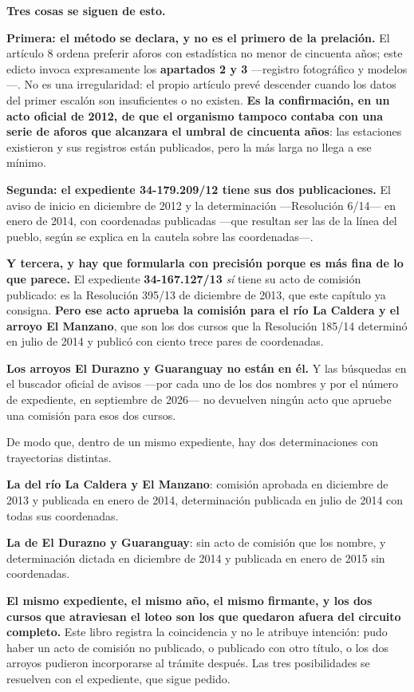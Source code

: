 \begin{cautela}
\textbf{Tres cosas se siguen de esto.}

\textbf{Primera: el método se declara, y no es el primero de la prelación.} El artículo 8
ordena preferir aforos con estadística no menor de cincuenta años; este edicto invoca
expresamente los \textbf{apartados 2 y 3} ---registro fotográfico y modelos---. No es una
irregularidad: el propio artículo prevé descender cuando los datos del primer escalón son
insuficientes o no existen. \textbf{Es la confirmación, en un acto oficial de 2012, de que el organismo tampoco contaba con una serie de aforos que alcanzara el umbral de cincuenta años}: las estaciones existieron y sus registros están publicados, pero la más larga no llega a ese mínimo.

\textbf{Segunda: el expediente 34-179.209/12 tiene sus dos publicaciones.} El aviso de inicio
en diciembre de 2012 y la determinación ---Resolución 6/14--- en enero de 2014, con coordenadas publicadas
---que resultan ser las de la línea del pueblo, según se explica en la cautela sobre las coordenadas---.

\textbf{Y tercera, y hay que formularla con precisión porque es más fina de lo que parece.}
El expediente \textbf{34-167.127/13} \textit{sí} tiene su acto de comisión publicado: es la
Resolución 395/13 de diciembre de 2013, que este capítulo ya consigna. \textbf{Pero ese acto
aprueba la comisión para el río La Caldera y el arroyo El Manzano}, que son los dos cursos que
la Resolución 185/14 determinó en julio de 2014 y publicó con ciento trece pares de
coordenadas.

\textbf{Los arroyos El Durazno y Guaranguay no están en él.} Y las búsquedas en el buscador
oficial de avisos ---por cada uno de los dos nombres y por el número de expediente, en septiembre de 2026--- no
devuelven ningún acto que apruebe una comisión para esos dos cursos.

\end{cautela}

\begin{cautela}
De modo que, dentro de un mismo expediente, hay dos determinaciones con trayectorias distintas.

\textbf{La del río La Caldera y El Manzano}: comisión aprobada en diciembre de 2013 y publicada en enero de
2014, determinación publicada en julio de 2014 con todas sus coordenadas.

\textbf{La de El Durazno y Guaranguay}: sin acto de comisión que los nombre, y determinación
dictada en diciembre de 2014 y publicada en enero de 2015 sin coordenadas.

\textbf{El mismo expediente, el mismo año, el mismo firmante, y los dos cursos que atraviesan
el loteo son los que quedaron afuera del circuito completo.} Este libro registra la
coincidencia y no le atribuye intención: pudo haber un acto de comisión no publicado, o
publicado con otro título, o los dos arroyos pudieron incorporarse al trámite después. Las tres
posibilidades se resuelven con el expediente, que sigue pedido.
\end{cautela}

